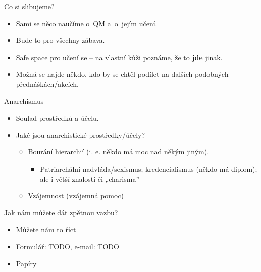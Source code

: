 \documentclass[11pt,t]{beamer}
\newenvironment{slidecontent}
	{\vspace*{\fill}
	}
	{
	\vspace*{\fill}
}
\newenvironment{slidetitle}
	{\vspace*{0.5cm}\hspace*{.2cm}\Huge
	}
	{
	\vspace*{0.6cm}
}
\begin{document}
{
\begin{frame}[plain]
\begin{slidetitle}
Co si slibujeme?
\end{slidetitle}
\begin{slidecontent}
\begin{itemize}
\item Sami se něco naučíme o~QM a~o~jejím učení.
\item Bude to pro všechny zábava.
\item Safe space pro učení se -- na vlastní kůži poznáme, že to \textbf{jde} jinak.
\item Možná se najde někdo, kdo by se chtěl podílet na dalších podobných přednáškách/akcích.
\end{itemize}
\end{slidecontent}
\end{frame}
}

{
\begin{frame}[plain]
\begin{slidetitle}
Anarchismus
\end{slidetitle}
\begin{slidecontent}
\begin{itemize}
\item Soulad prostředků a účelu.
\pause
\item Jaké jsou anarchistické prostředky/účely?
\begin{itemize}
\item Bourání hierarchií (i. e. někdo má moc nad někým jiným).
\begin{itemize}
\item Patriarchální nadvláda/sexismus; kredencialismus (někdo má diplom); ale i
větší znalosti či „charisma”
\end{itemize}
\item Vzájemnost (vzájemná pomoc)
\end{itemize}
\end{itemize}
\end{slidecontent}
\end{frame}
}

{
\begin{frame}[plain]
\begin{slidetitle}
Jak nám můžete dát zpětnou vazbu?
\end{slidetitle}
\begin{slidecontent}
\begin{itemize}
\item Můžete nám to říct
\item Formulář: TODO, e-mail: TODO
\item Papíry
\end{itemize}
\end{slidecontent}
\end{frame}
}
\end{document}
